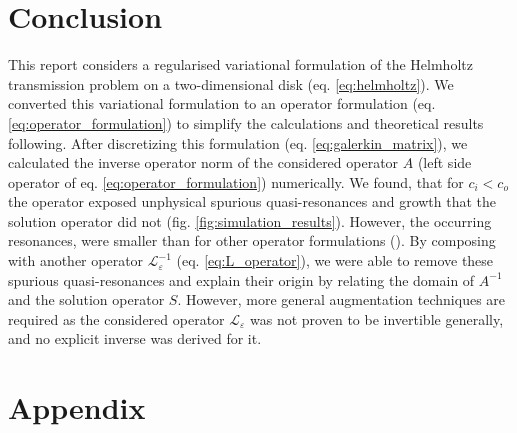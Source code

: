\documentclass[12pt,journal,compsoc, onecolumn]{IEEEtran}
\begin{document}
\section{Conclusion}
This report considers a regularised variational formulation of the Helmholtz transmission problem on a two-dimensional disk (eq. \ref{eq:helmholtz}). We converted this variational formulation to an operator formulation (eq. \ref{eq:operator_formulation}) to simplify the  calculations and theoretical results following. After discretizing this formulation (eq. \ref{eq:galerkin_matrix}), we calculated the inverse operator norm of the considered operator $A$ (left side operator of eq. \ref{eq:operator_formulation}) numerically. We found, that for $c_i < c_o$ the operator exposed unphysical spurious quasi-resonances and growth that the solution operator did not (fig. \ref{fig:simulation_results}). However, the occurring resonances, were smaller than for other operator formulations (\cite{hiptmair2021spurious}). By composing with another operator $\mathcal{L}_\varepsilon^{-1}$ (eq. \ref{eq:L_operator}), we were able to remove these spurious quasi-resonances and explain their origin by relating the domain of $A^{-1}$ and the solution operator $S$. However, more general augmentation techniques are required as the considered operator $\mathcal{L}_\varepsilon$ was not proven to be invertible generally, and no explicit inverse was derived for it. 

\section{Appendix}
\label{section:appendix}
\end{document}

